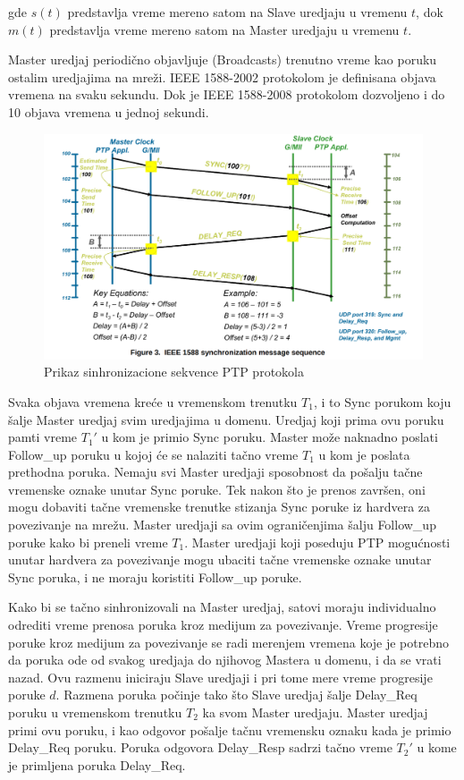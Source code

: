 \documentclass[a4paper,12pt, master]{etf}
\begin{document}
	gde $s(t)$ predstavlja vreme mereno satom na Slave uredjaju u vremenu $t$, 
	dok $m(t)$ predstavlja vreme mereno satom na Master uredjaju u vremenu $t$.

	Master uredjaj periodi\v{c}no objavljuje (Broadcasts) trenutno vreme kao 
	poruku ostalim uredjajima na mre\v{z}i. IEEE 1588-2002 protokolom je 
	definisana objava vremena na svaku sekundu. Dok je IEEE 1588-2008 
	protokolom dozvoljeno i do 10 objava vremena u jednoj sekundi.

	\begin{figure}[htb]
			\centering
			\includegraphics[scale=.3]{../pic/ieee_1588_sync_sequence.png}
			\caption{Prikaz sinhronizacione sekvence PTP protokola}
			\label{fig:ieee_1588_sync_sequence}
	\end{figure}

	Svaka objava vremena kre\'{c}e u vremenskom trenutku $T_1$, i to Sync 
	porukom koju \v{s}alje Master uredjaj svim uredjajima u domenu. Uredjaj 
	koji prima ovu poruku pamti vreme $T_1'$ u kom je primio Sync poruku. 
	Master mo\v{z}e naknadno poslati Follow\_up poruku u kojoj \'{c}e se 
	nalaziti ta\v{c}no vreme $T_1$ u kom je poslata prethodna poruka. Nemaju 
	svi Master uredjaji sposobnost da po\v{s}alju ta\v{c}ne vremenske oznake 
	unutar Sync poruke. Tek nakon \v{s}to je prenos zavr\v{s}en, oni mogu 
	dobaviti ta\v{c}ne vremenske trenutke stizanja Sync poruke iz hardvera za 
	povezivanje na mre\v{z}u. Master uredjaji sa ovim ograni\v{c}enjima 
	\v{s}alju Follow\_up poruke kako bi preneli vreme $T_1$. Master uredjaji 
	koji poseduju PTP mogu\'{c}nosti unutar hardvera za povezivanje mogu 
	ubaciti ta\v{c}ne vremenske oznake unutar Sync poruka, i ne moraju 
	koristiti Follow\_up poruke.

	Kako bi se ta\v{c}no sinhronizovali na Master uredjaj, satovi moraju 
	individualno odrediti vreme prenosa poruka kroz medijum za povezivanje. 
	Vreme progresije poruke kroz medijum za	povezivanje	se radi merenjem 
	vremena koje je potrebno da poruka ode od svakog uredjaja do njihovog 
	Mastera u domenu, i da se vrati nazad. Ovu razmenu iniciraju Slave uredjaji 
	i pri tome mere vreme progresije poruke $d$. Razmena poruka po\v{c}inje 
	tako \v{s}to Slave uredjaj \v{s}alje Delay\_Req poruku u vremenskom 
	trenutku $T_2$ ka svom Master uredjaju. Master uredjaj primi ovu poruku, i 
	kao	odgovor po\v{s}alje ta\v{c}nu vremensku oznaku kada je primio Delay\_Req
	poruku. Poruka odgovora	Delay\_Resp sadrzi ta\v{c}no vreme $T_2'$ u kome je 
	primljena poruka Delay\_Req.
\end{document}
